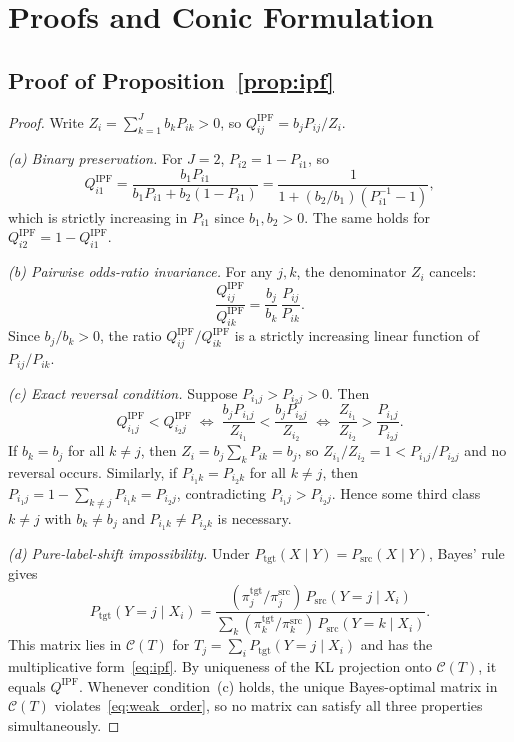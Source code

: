 \documentclass[11pt]{article}
\begin{document}
\clearpage
\appendix

\section{Proofs and Conic Formulation}
\label{app:proofs}

\subsection{Proof of \texorpdfstring{Proposition~\ref{prop:ipf}}{Proposition 1}}

\begin{proof}
Write $Z_i = \sum_{k=1}^J b_k P_{ik} > 0$, so $Q^{\mathrm{IPF}}_{ij} = b_j P_{ij} / Z_i$.

\emph{(a) Binary preservation.} For $J=2$, $P_{i2} = 1 - P_{i1}$, so
\[
Q^{\mathrm{IPF}}_{i1} = \frac{b_1 P_{i1}}{b_1 P_{i1} + b_2(1 - P_{i1})} = \frac{1}{1 + (b_2/b_1)(P_{i1}^{-1} - 1)},
\]
which is strictly increasing in $P_{i1}$ since $b_1, b_2 > 0$. The same holds for $Q^{\mathrm{IPF}}_{i2} = 1 - Q^{\mathrm{IPF}}_{i1}$.

\emph{(b) Pairwise odds-ratio invariance.} For any $j, k$, the denominator $Z_i$ cancels:
\[
\frac{Q^{\mathrm{IPF}}_{i j}}{Q^{\mathrm{IPF}}_{i k}} = \frac{b_j}{b_k}\,\frac{P_{ij}}{P_{ik}}.
\]
Since $b_j / b_k > 0$, the ratio $Q^{\mathrm{IPF}}_{ij} / Q^{\mathrm{IPF}}_{ik}$ is a strictly increasing linear function of $P_{ij} / P_{ik}$.

\emph{(c) Exact reversal condition.} Suppose $P_{i_1 j} > P_{i_2 j} > 0$. Then
\[
Q^{\mathrm{IPF}}_{i_1 j} < Q^{\mathrm{IPF}}_{i_2 j}
\;\Longleftrightarrow\;
\frac{b_j P_{i_1 j}}{Z_{i_1}} < \frac{b_j P_{i_2 j}}{Z_{i_2}}
\;\Longleftrightarrow\;
\frac{Z_{i_1}}{Z_{i_2}} > \frac{P_{i_1 j}}{P_{i_2 j}}.
\]
If $b_k = b_j$ for all $k \ne j$, then $Z_i = b_j \sum_k P_{ik} = b_j$, so $Z_{i_1}/Z_{i_2} = 1 < P_{i_1 j}/P_{i_2 j}$ and no reversal occurs. Similarly, if $P_{i_1 k} = P_{i_2 k}$ for all $k \ne j$, then $P_{i_1 j} = 1 - \sum_{k \ne j} P_{i_1 k} = P_{i_2 j}$, contradicting $P_{i_1 j} > P_{i_2 j}$. Hence some third class $k \ne j$ with $b_k \ne b_j$ and $P_{i_1 k} \ne P_{i_2 k}$ is necessary.

\emph{(d) Pure-label-shift impossibility.} Under $P_{\mathrm{tgt}}(X \mid Y) = P_{\mathrm{src}}(X \mid Y)$, Bayes' rule gives
\[
P_{\mathrm{tgt}}(Y=j \mid X_i) = \frac{(\pi^{\mathrm{tgt}}_j / \pi^{\mathrm{src}}_j)\, P_{\mathrm{src}}(Y=j \mid X_i)}{\sum_k (\pi^{\mathrm{tgt}}_k / \pi^{\mathrm{src}}_k)\, P_{\mathrm{src}}(Y=k \mid X_i)}.
\]
This matrix lies in $\mathcal{C}(T)$ for $T_j = \sum_i P_{\mathrm{tgt}}(Y=j \mid X_i)$ and has the multiplicative form~\eqref{eq:ipf}. By uniqueness of the KL projection onto $\mathcal{C}(T)$, it equals $Q^{\mathrm{IPF}}$. Whenever condition~(c) holds, the unique Bayes-optimal matrix in $\mathcal{C}(T)$ violates~\eqref{eq:weak_order}, so no matrix can satisfy all three properties simultaneously.
\end{proof}
\end{document}
